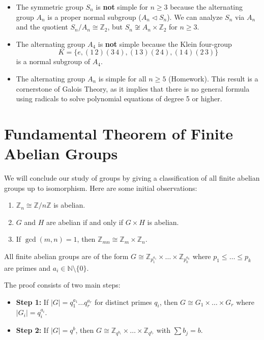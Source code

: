 \begin{example}
\begin{itemize}
    \item The symmetric group $S_n$ is \textbf{not} simple for $n \geq 3$ because the alternating group $A_n$ is a proper normal subgroup ($A_n \triangleleft S_n$). We can analyze $S_n$ via $A_n$ and the quotient $S_n/A_n \cong \mathbb{Z}_2$, but $S_n \not\cong A_n \times \mathbb{Z}_2$ for $n \geq 3$.
    
    \item The alternating group $A_4$ is \textbf{not} simple because the Klein four-group 
    $$K = \{ e, (1\,2)(3\,4), (1\,3)(2\,4), (1\,4)(2\,3) \}$$ is a normal subgroup of $A_4$.
    
    \item The alternating group $A_n$ is simple for all $n \geq 5$ (Homework). This result is a cornerstone of Galois Theory, as it implies that there is no general formula using radicals to solve polynomial equations of degree 5 or higher.
\end{itemize}
\end{example}

\section{Fundamental Theorem of Finite Abelian Groups}
We will conclude our study of groups by giving a classification of all finite abelian groups up to isomorphism. Here are some initial observations:
\begin{enumerate}
    \item[(1)] $\mathbb{Z}_n \cong \mathbb{Z}/n\mathbb{Z}$ is abelian.
    \item[(2)] $G$ and $H$ are abelian if and only if $G \times H$ is abelian.
    \item[(3)] If $\gcd(m, n) = 1$, then $\mathbb{Z}_{mn} \cong \mathbb{Z}_m \times \mathbb{Z}_n$.
\end{enumerate}

\begin{theorem}
All finite abelian groups are of the form $G \cong \mathbb{Z}_{p_1^{a_1}} \times \dots \times \mathbb{Z}_{p_k^{a_k}}$ where $p_1 \le \dots \le p_k$ are primes and $a_i \in \mathbb{N} \setminus \{0\}$.
\end{theorem}

The proof consists of two main steps:
\begin{itemize}
    \item \textbf{Step 1:} If $|G| = q_1^{a_1} \dots q_r^{a_r}$ for distinct primes $q_i$, then $G \cong G_1 \times \dots \times G_r$ where $|G_i| = q_i^{a_i}$.
    \item \textbf{Step 2:} If $|G| = q^b$, then $G \cong \mathbb{Z}_{q^{b_1}} \times \dots \times \mathbb{Z}_{q^{b_r}}$ with $\sum b_j = b$.
\end{itemize}


